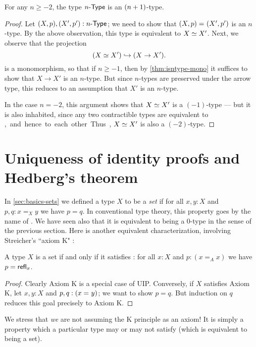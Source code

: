 \begin{thm}\label{thm:hleveln-of-hlevelSn}
 For any $n \geq -2$, the type ${n}\text-\mathsf{Type}$ is an $(n+1)$-type.
\end{thm}
\begin{proof}%
  Let $(X, p), (X', p') : {n}\text-\mathsf{Type}$; we need to show that $(X, p) =_{} (X', p')$ is an $n$-type.
  By the above observation, this type is equivalent to $X \simeq X'$.
  Next, we observe that the projection
  \[(X \simeq X') \hookrightarrow (X \rightarrow X').\]
  is a monomorphism, so that if $n\geq -1$, then by \autoref{thm:isntype-mono} it suffices to show that $X \rightarrow X'$ is an $n$-type.
  But since $n$-types are preserved under the arrow type, this reduces to an assumption that $X'$ is an $n$-type.

  In the case $n=-2$, this argument shows that $X \simeq X'$ is a $(-1)$-type --- but it is also inhabited, since any two contractible types
are equivalent to \unit, and hence to each other.
  Thus, $X \simeq X'$ is also a $(-2)$-type.
\end{proof}

\section{Uniqueness of identity proofs and Hedberg's theorem}
\label{sec:hedberg}

In \autoref{sec:basics-sets} we defined a type $X$ to be a \emph{set} if for all $x, y : X$ and $p, q : x =_X y$ we have $p = q$.
In conventional type theory, this property goes by the name of .
We have seen also that it is equivalent to being a $0$-type in the sense of the previous section.
Here is another equivalent characterization, involving Streicher's ``axiom K" \cite{StreicherK}:

\begin{thm}\label{thm:h-set-uip-K}
 A type $X$ is a set if and only if it satisfies : for all $x : X$ and $p : (x =_A x)$ we have $p = \mathsf{refl}_{x}$.
\end{thm}

\begin{proof}
  Clearly Axiom K is a special case of UIP.
  Conversely, if $X$ satisfies Axiom K, let $x, y : X$ and $p, q : (x =_{} y)$; we want to show $p=q$.
  But induction on $q$ reduces this goal precisely to Axiom K.
\end{proof}

We stress that \emph{we} are not assuming the K principle as an axiom!
It is simply a property which a particular type may or may not satisfy (which is equivalent to being a set).


